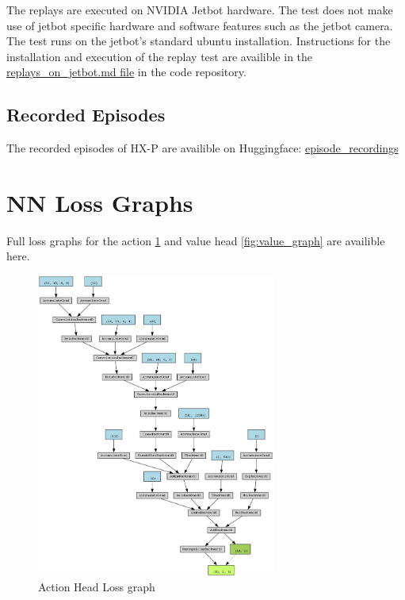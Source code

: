 The replays are executed on NVIDIA Jetbot hardware. The test does not make use of jetbot specific hardware and software features such as the jetbot camera. The test runs on the jetbot's standard ubuntu installation. Instructions for the installation and execution of the replay test are availible in the \href{https://github.com/geschnee/carsim-rl-cnn/blob/main/replays_on_jetbot.md}{replays\_on\_jetbot.md file} in the code repository.

\subsection{Recorded Episodes}

The recorded episodes of \ac{HX-P} are availible on Huggingface:
\href{https://huggingface.co/geschnee/carsim-rl-cnn/tree/main/episode_recordings}{episode\_recordings}


\section{\ac{NN} Loss Graphs}

Full loss graphs for the action \ref{fig:action_graph} and value head \ref{fig:value_graph} are availible here.

\begin{figure}
    \centering
    \includegraphics[width=0.7\textwidth]{Bilder/action_graph.png}
    \caption{Action Head Loss graph}
    \label{fig:action_graph}
\end{figure}

